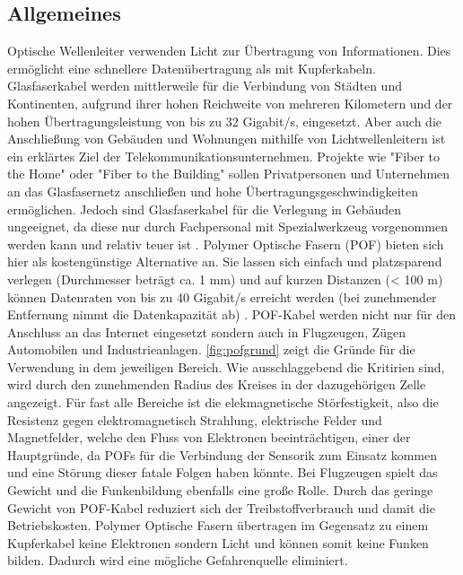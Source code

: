 \subsection{Allgemeines}
\label{subsec:pofallgemeines}

Optische Wellenleiter verwenden Licht zur Übertragung von Informationen. Dies
ermöglicht eine schnellere Datenübertragung als mit Kupferkabeln. Glasfaserkabel
werden mittlerweile für die Verbindung von Städten und Kontinenten, aufgrund
ihrer hohen Reichweite von mehreren Kilometern und der hohen
Übertragungsleistung von bis zu 32 Gigabit/s, eingesetzt. Aber auch die
Anschließung von Gebäuden und Wohnungen mithilfe von Lichtwellenleitern ist ein
erklärtes Ziel der Telekommunikationsunternehmen. Projekte wie
"Fiber to the Home" oder "Fiber
to the Building" sollen Privatpersonen und Unternehmen an das
Glasfasernetz anschließen und hohe Übertragungsgeschwindigkeiten ermöglichen.
Jedoch sind Glasfaserkabel für die Verlegung in Gebäuden ungeeignet, da diese
nur durch Fachpersonal mit Spezialwerkzeug vorgenommen werden kann und relativ
teuer ist \cite{poflan}. Polymer Optische Fasern (POF) bieten sich hier als
kostengünstige Alternative an. Sie lassen sich einfach und platzsparend verlegen
(Durchmesser beträgt ca. 1 mm) und auf kurzen Distanzen (< 100 m) können
Datenraten von bis zu 40 Gigabit/s \cite{pofacgif} erreicht werden (bei
zunehmender Entfernung nimmt die Datenkapazität ab) \cite{pofacprofile}.
POF-Kabel werden nicht nur für den Anschluss an das Internet eingesetzt sondern
auch in Flugzeugen, Zügen Automobilen und Industrieanlagen.
\autoref{fig:pofgrund} zeigt die Gründe für die Verwendung in dem jeweiligen
Bereich. Wie ausschlaggebend die Kritirien sind, wird durch den zunehmenden
Radius des Kreises in der dazugehörigen Zelle angezeigt. Für fast alle Bereiche
ist die elekmagnetische Störfestigkeit, also die Resistenz gegen
elektromagnetisch Strahlung, elektrische Felder und Magnetfelder, welche den
Fluss von Elektronen beeinträchtigen, einer der Hauptgründe, da POFs für die
Verbindung der Sensorik zum Einsatz kommen und eine Störung dieser fatale Folgen
haben könnte. Bei Flugzeugen spielt das Gewicht und die Funkenbildung ebenfalls
eine große Rolle. Durch das geringe Gewicht von POF-Kabel reduziert sich der
Treibstoffverbrauch und damit die Betriebskosten. Polymer Optische Fasern
übertragen im Gegensatz zu einem Kupferkabel keine Elektronen sondern Licht und
können somit keine Funken bilden. Dadurch wird eine mögliche Gefahrenquelle
eliminiert.

